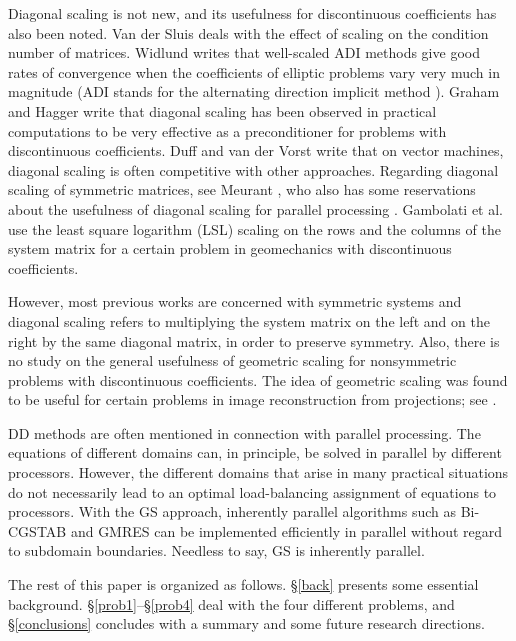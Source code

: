\documentclass[12pt,a4paper]{article}
\newcounter{i}
\begin{document}
Diagonal scaling is not new, and its usefulness for discontinuous
coefficients has also been noted.  Van der Sluis \cite{Sluis69} 
deals with the effect of scaling on the condition number of matrices.  
Widlund \cite[p.\ 34-35]{Widlund71} writes that well-scaled ADI 
methods give good rates of convergence when the coefficients of 
elliptic problems vary very much in magnitude (ADI stands for the 
alternating direction implicit method \cite{Peaceman55}).  Graham 
and Hagger \cite[p.\ 2042-2043]{Graham99} write that diagonal 
scaling has been observed in practical computations to be very 
effective as a preconditioner for problems with discontinuous 
coefficients.  Duff and van der Vorst \cite{Duff98} write that 
on vector machines, diagonal scaling is often competitive with 
other approaches.  Regarding diagonal scaling of symmetric matrices, 
see Meurant \cite[Th. 8.1, 8.2]{Meurant99}, who also has some 
reservations about the usefulness of diagonal scaling for parallel 
processing \cite[p.\ 401]{Meurant99}.  Gambolati et al.\ 
\cite{Gambolati03} use the least square logarithm (LSL) scaling 
on the rows and the columns of the system matrix for a certain 
problem in geomechanics with discontinuous coefficients.

However, most previous works are concerned with symmetric systems
and diagonal scaling refers to multiplying the system matrix on 
the left and on the right by the same diagonal matrix, in order 
to preserve symmetry.  Also, there is no study on the general 
usefulness of geometric scaling for nonsymmetric problems with 
discontinuous coefficients.  The idea of geometric scaling was 
found to be useful for certain problems in image reconstruction 
from projections; see \cite{Gordon07}.

DD methods are often mentioned in connection with parallel 
processing.  The equations of different domains can, in 
principle, be solved in parallel by different processors.  
However, the different domains that arise in many practical 
situations do not necessarily lead to an optimal load-balancing 
assignment of equations to processors.  With the GS approach, 
inherently parallel algorithms such as Bi-CGSTAB and GMRES can 
be implemented efficiently in parallel without regard to 
subdomain boundaries.  Needless to say, GS is inherently 
parallel.

The rest of this paper is organized as follows.  \S \ref{back} 
presents some essential background.  \S \ref{prob1}--\S \ref{prob4} 
deal with the four different problems, and \S \ref{conclusions} 
concludes with a summary and some future research directions.
\end{document}
